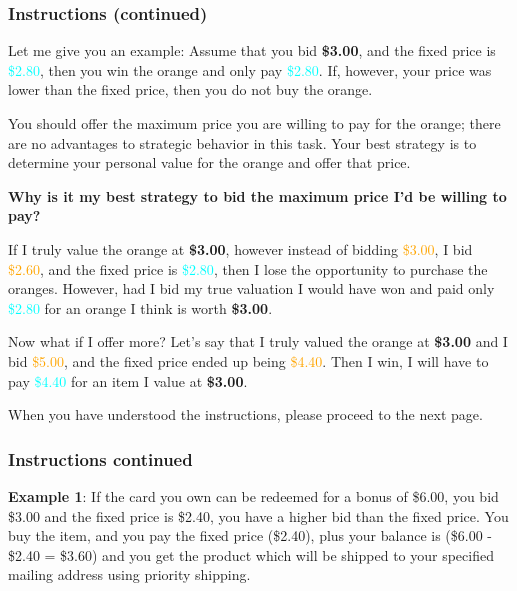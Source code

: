 \documentclass[12pt]{article}
\begin{document}
{\begin{figure}[H]
\end{figure}

\clearpage


\subsubsection*{Instructions (continued)}
Let me give you an example: Assume that you bid \textbf{\$3.00}, and the fixed price is \textcolor{cyan}{\$2.80}, then you win the orange and only pay \textcolor{cyan}{\$2.80}. If, however, your price was lower than the fixed price, then you do not buy the orange.  

You should offer the maximum price you are willing to pay for the orange; there are no advantages to strategic behavior in this task. Your best strategy is to determine your personal value for the orange and offer that price.  

\vspace{0.3cm}

\textbf{Why is it my best strategy to bid the maximum price I’d be willing to pay?}  

If I truly value the orange at \textbf{\$3.00}, however instead of bidding \textcolor{orange}{\$3.00}, I bid \textcolor{orange}{\$2.60}, and the fixed price is \textcolor{cyan}{\$2.80}, then I lose the opportunity to purchase the oranges. However, had I bid my true valuation I would have won and paid only \textcolor{cyan}{\$2.80} for an orange I think is worth \textbf{\$3.00}.  

Now what if I offer more? Let’s say that I truly valued the orange at \textbf{\$3.00} and I bid \textcolor{orange}{\$5.00}, and the fixed price ended up being \textcolor{orange}{\$4.40}. Then I win, I will have to pay \textcolor{cyan}{\$4.40} for an item I value at \textbf{\$3.00}.  

\vspace{0.5cm} 

When you have understood the instructions, please proceed to the next page.  


\clearpage


\subsubsection*{Instructions continued}


\textbf{Example 1}: If the card you own can be redeemed for a bonus of \$6.00, you bid \$3.00 and the fixed price is \$2.40, you have a higher bid than the fixed price. You buy the item, and you pay the fixed price (\$2.40), plus your balance is (\$6.00 - \$2.40 = \$3.60) and you get the product which will be shipped to your specified mailing address using priority shipping.
\vspace{0.5cm}


}
\end{document}
